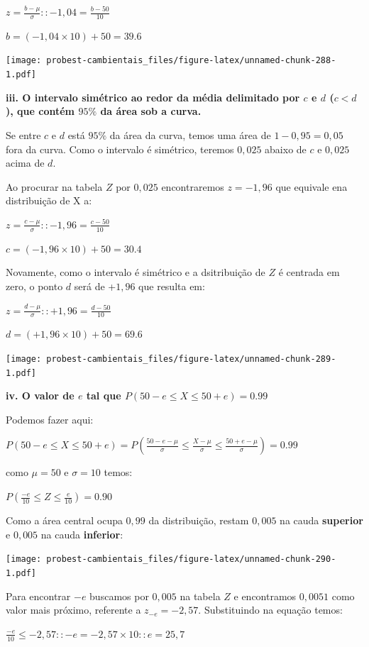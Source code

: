 \documentclass[
]{book}
\begin{document}
\(z = \frac{b - \mu}{\sigma} :: -1,04 = \frac{b - 50}{10}\)

\(b = (-1,04 \times 10) + 50 = 39.6\)

\texttt{[image: probest-cambientais\_files/figure-latex/unnamed-chunk-288-1.pdf]}

\textbf{iii. O intervalo simétrico ao redor da média delimitado por \(c\) e \(d\) (\(c < d\)), que contém \(95\%\) da área sob a curva.}

Se entre \(c\) e \(d\) está \(95\%\) da área da curva, temos uma área de \(1 - 0,95 = 0,05\) fora da curva. Como o intervalo é simétrico, teremos \(0,025\) abaixo de \(c\) e \(0,025\) acima de \(d\).

Ao procurar na tabela \(Z\) por \(0,025\) encontraremos \(z = -1,96\) que equivale ena distribuição de X a:

\(z = \frac{c - \mu}{\sigma} :: -1,96 = \frac{c - 50}{10}\)

\(c = (-1,96 \times 10) + 50 = 30.4\)

Novamente, como o intervalo é simétrico e a dsitribuição de \(Z\) é centrada em zero, o ponto \(d\) será de +\(1,96\) que resulta em:

\(z = \frac{d - \mu}{\sigma} :: +1,96 = \frac{d - 50}{10}\)

\(d = (+1,96 \times 10) + 50 = 69.6\)

\texttt{[image: probest-cambientais\_files/figure-latex/unnamed-chunk-289-1.pdf]}

\textbf{iv. O valor de \(e\) tal que \(P(50-e \le X \le 50+e) = 0.99\)}

Podemos fazer aqui:

\(P(50-e \le X \le 50+e) = P(\frac{50-e - \mu}{\sigma} \le \frac{X-\mu}{\sigma} \le \frac{50+e-\mu}{\sigma}) = 0.99\)

como \(\mu = 50\) e \(\sigma = 10\) temos:

\(P(\frac{-e}{10} \le Z \le \frac{e}{10}) = 0.90\)

Como a área central ocupa \(0,99\) da distribuição, restam \(0,005\) na cauda \textbf{superior} e \(0,005\) na cauda \textbf{inferior}:

\texttt{[image: probest-cambientais\_files/figure-latex/unnamed-chunk-290-1.pdf]}

Para encontrar \(-e\) buscamos por \(0,005\) na tabela \(Z\) e encontramos \(0,0051\) como valor mais próximo, referente a \(z_{-e} = -2,57\). Substituindo na equação temos:

\(\frac{-e}{10} \le -2,57 :: -e = -2,57 \times 10 :: e = 25,7\)
\end{document}
